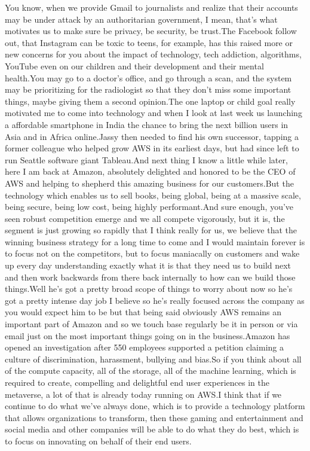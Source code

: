 \documentclass{article}%
\begin{document}
You know, when we provide Gmail to journalists and realize that their accounts may be under attack by an authoritarian government, I mean, that's what motivates us to make sure be privacy, be security, be trust.The Facebook follow out, that Instagram can be toxic to teens, for example, has this raised more or new concerns for you about the impact of technology, tech addiction, algorithms, YouTube even on our children and their development and their mental health.You may go to a doctor's office, and go through a scan, and the system may be prioritizing for the radiologist so that they don't miss some important things, maybe giving them a second opinion.The one laptop or child goal really motivated me to come into technology and when I look at last week us launching a affordable smartphone in India the chance to bring the next billion users in Asia and in Africa online.Jassy then needed to find his own successor, tapping a former colleague who helped grow AWS in its earliest days, but had since left to run Seattle software giant Tableau.And next thing I know a little while later, here I am back at Amazon, absolutely delighted and honored to be the CEO of AWS and helping to shepherd this amazing business for our customers.But the technology which enables us to sell books, being global, being at a massive scale, being secure, being low cost, being highly performant.And sure enough, you've seen robust competition emerge and we all compete vigorously, but it is, the segment is just growing so rapidly that I think really for us, we believe that the winning business strategy for a long time to come and I would maintain forever is to focus not on the competitors, but to focus maniacally on customers and wake up every day understanding exactly what it is that they need us to build next and then work backwards from there back internally to how can we build those things.Well he's got a pretty broad scope of things to worry about now so he's got a pretty intense day job I believe so he's really focused across the company as you would expect him to be but that being said obviously AWS remains an important part of Amazon and so we touch base regularly be it in person or via email just on the most important things going on in the business.Amazon has opened an investigation after 550 employees supported a petition claiming a culture of discrimination, harassment, bullying and bias.So if you think about all of the compute capacity, all of the storage, all of the machine learning, which is required to create, compelling and delightful end user experiences in the metaverse, a lot of that is already today running on AWS.I think that if we continue to do what we've always done, which is to provide a technology platform that allows organizations to transform, then these gaming and entertainment and social media and other companies will be able to do what they do best, which is to focus on innovating on behalf of their end users.%
\end{document}
